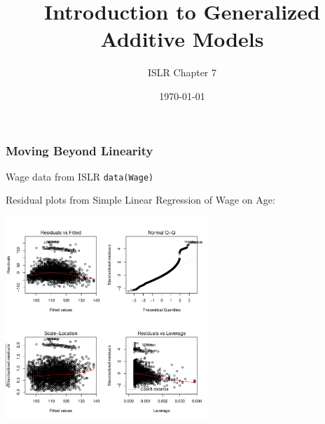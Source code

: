 \documentclass[]{beamer}\usepackage[]{graphicx}\usepackage[]{color}
\title{Introduction to Generalized Additive Models}
\author{ISLR Chapter 7 }
\date{\today}
\begin{document}
\maketitle



\begin{frame}[fragile]\frametitle{Moving Beyond Linearity}
Wage data from ISLR   {\tt data(Wage)}

Residual plots from Simple Linear Regression of Wage on Age:


\centerline{\includegraphics[height=3in]{resid-slr}}
\end{frame}
\end{document}

